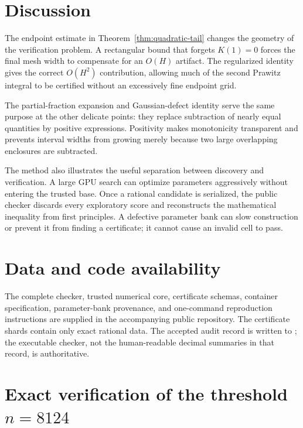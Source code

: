 \documentclass[11pt,a4paper,twoside]{article}
\theoremstyle{remark}
\begin{document}
\section{Discussion}

The endpoint estimate in Theorem~\ref{thm:quadratic-tail} changes the
geometry of the verification problem.  A rectangular bound that forgets
\(K(1)=0\) forces the final mesh width to compensate for an \(O(H)\)
artifact.  The regularized identity gives the correct \(O(H^2)\)
contribution, allowing much of the second Prawitz integral to be certified
without an excessively fine endpoint grid.

The partial-fraction expansion and Gaussian-defect identity serve the same
purpose at the other delicate points: they replace subtraction of nearly
equal quantities by positive expressions.  Positivity makes monotonicity
transparent and prevents interval widths from growing merely because two
large overlapping enclosures are subtracted.

The method also illustrates the useful separation between discovery and
verification.  A large GPU search can optimize parameters aggressively
without entering the trusted base.  Once a rational candidate is serialized,
the public checker discards every exploratory score and reconstructs the
mathematical inequality from first principles.  A defective parameter bank
can slow construction or prevent it from finding a certificate; it cannot
cause an invalid cell to pass.

\section*{Data and code availability}

The complete checker, trusted numerical core, certificate schemas,
container specification, parameter-bank provenance, and one-command
reproduction instructions are supplied in the accompanying public
repository.  The certificate shards contain only exact rational data.  The
accepted audit record is written to
; the executable checker, not
the human-readable decimal summaries in that record, is authoritative.

\appendix

\section{Exact verification of the threshold
\texorpdfstring{\(n=8124\)}{n=8124}}
\label{app:threshold}
\end{document}
